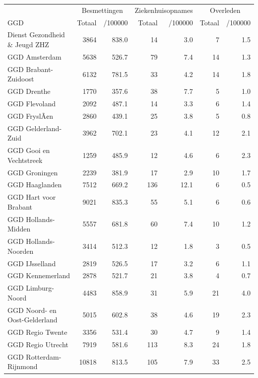 \documentclass[
  english,
  man,floatsintext]{apa6}
\begin{document}
\begin{table}
\centering\begingroup\fontsize{10}{12}\selectfont

\begin{threeparttable}
\begin{tabular}{lrrrrrr}
\toprule
\multicolumn{1}{c}{ } & \multicolumn{2}{c}{Besmettingen} & \multicolumn{2}{c}{Ziekenhuisopnames} & \multicolumn{2}{c}{Overleden} \\
\cmidrule(l{3pt}r{3pt}){2-3} \cmidrule(l{3pt}r{3pt}){4-5} \cmidrule(l{3pt}r{3pt}){6-7}
GGD & Totaal & /100000 & Totaal & /100000 & Totaal & /100000\\
\midrule
Dienst Gezondheid \& Jeugd ZHZ & 3864 & 838.0 & 14 & 3.0 & 7 & 1.5\\
GGD Amsterdam & 5638 & 526.7 & 79 & 7.4 & 14 & 1.3\\
GGD Brabant-Zuidoost & 6132 & 781.5 & 33 & 4.2 & 14 & 1.8\\
GGD Drenthe & 1770 & 357.6 & 38 & 7.7 & 5 & 1.0\\
GGD Flevoland & 2092 & 487.1 & 14 & 3.3 & 6 & 1.4\\
GGD FryslÃ¢n & 2860 & 439.1 & 25 & 3.8 & 5 & 0.8\\
GGD Gelderland-Zuid & 3962 & 702.1 & 23 & 4.1 & 12 & 2.1\\
GGD Gooi en Vechtstreek & 1259 & 485.9 & 12 & 4.6 & 6 & 2.3\\
GGD Groningen & 2239 & 381.9 & 17 & 2.9 & 10 & 1.7\\
GGD Haaglanden & 7512 & 669.2 & 136 & 12.1 & 6 & 0.5\\
GGD Hart voor Brabant & 9021 & 835.3 & 55 & 5.1 & 6 & 0.6\\
GGD Hollands-Midden & 5557 & 681.8 & 60 & 7.4 & 10 & 1.2\\
GGD Hollands-Noorden & 3414 & 512.3 & 12 & 1.8 & 3 & 0.5\\
GGD IJsselland & 2819 & 526.5 & 17 & 3.2 & 6 & 1.1\\
GGD Kennemerland & 2878 & 521.7 & 21 & 3.8 & 4 & 0.7\\
GGD Limburg-Noord & 4483 & 858.9 & 31 & 5.9 & 21 & 4.0\\
GGD Noord- en Oost-Gelderland & 5015 & 602.8 & 38 & 4.6 & 19 & 2.3\\
GGD Regio Twente & 3356 & 531.4 & 30 & 4.7 & 9 & 1.4\\
GGD Regio Utrecht & 7919 & 581.6 & 113 & 8.3 & 24 & 1.8\\
GGD Rotterdam-Rijnmond & 10818 & 813.5 & 105 & 7.9 & 33 & 2.5\\

\end{tabular}
\end{threeparttable}
\end{table}
\end{document}
